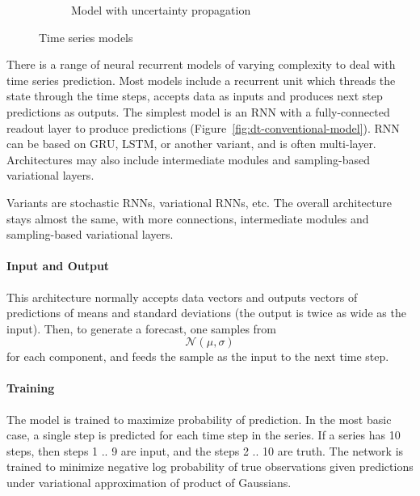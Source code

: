\documentclass[runningheads]{llncs}
\begin{document}
\begin{figure}
\begin{subfigure}{.36\textwidth}
\caption{Model with uncertainty propagation}
\label{fig:dt-uncertainty-propagation}
\end{subfigure}
\caption{Time series models}
\label{fig:dt-time-series-models}
\end{figure}

There is a range of neural recurrent models of varying complexity to deal with
time series prediction. Most models include a recurrent unit which threads the
state through the time steps, accepts data as inputs and produces next step
predictions as outputs. The simplest model is an RNN with a fully-connected
readout layer to produce predictions (Figure~\ref{fig:dt-conventional-model}).
RNN can be based on GRU, LSTM, or another variant, and is often multi-layer.
Architectures  may also include intermediate modules and sampling-based
variational layers.

Variants are stochastic RNNs, variational RNNs, etc. The
overall architecture stays almost the same, with more
connections, intermediate modules and sampling-based variational
layers.

\paragraph{Input and Output} This architecture normally accepts data vectors
and outputs vectors of predictions of means and standard deviations (the output
is twice as wide as the input). Then, to generate a forecast, one samples from
$$\mathcal{N}(\mu, \sigma)$$ for each component, and feeds the sample as the
input to the next time step.

\paragraph{Training} The model is trained to maximize probability of
prediction. In the most basic case, a single step is predicted for each time
step in the series. If a series has 10 steps, then steps 1 .. 9 are input, and
the steps 2 .. 10 are truth. The network is trained to
minimize negative log probability of true observations given
predictions under variational approximation of product of
Gaussians. 
\end{document}
